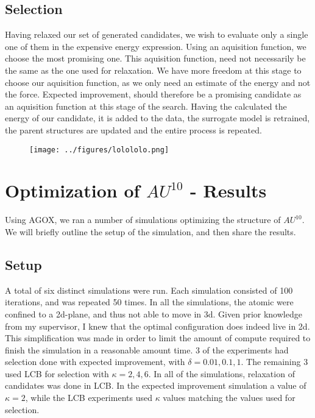 \documentclass[working, oneside]{../../../Preambles/marginclass}
\begin{document}
\subsection{Selection}
Having relaxed our set of generated candidates, we wish to evaluate only a single one of them in the expensive energy expression. Using an aquisition function, we choose the most promising one. This aquisition function, need not necessarily be the same as the one used for relaxation. We have more freedom at this stage to choose our aquisition function, as we only need an estimate of the energy and not the force. Expected improvement, should therefore be a promising candidate as an aquisition function at this stage of the search. Having the calculated the energy of our candidate, it is added to the data, the surrogate model is retrained, the parent structures are updated and the entire process is repeated.
\newpage
{}
\begin{figure}[htpb]
    \centering
    \texttt{[image: ../figures/lolololo.png]}
    \label{fig:}
\end{figure}

\section{Optimization of $AU^{10}$ - Results}


Using AGOX, we ran a number of simulations optimizing the structure of $AU^{10}$. We will briefly outline the setup of the simulation, and then share the results.

\subsection{Setup}
A total of six distinct simulations were run. Each simulation consisted of 100 iterations, and was repeated 50 times. In all the simulations, the atomic were confined to a 2d-plane, and thus not able to move in 3d. Given prior knowledge from my supervisor, I knew that the optimal configuration does indeed live in 2d. This simplification was made in order to limit the amount of compute required to finish the simulation in a reasonable amount time. 3 of the experiments had selection done with expected improvement, with $\delta = 0.01, 0.1, 1$. The remaining 3 used LCB for selection with $\kappa = 2, 4 ,6$. In all of the simulations, relaxation of candidates was done in LCB. In the expected improvement simulation a value of $\kappa = 2$, while the LCB experiments used $\kappa$ values matching the values used for selection.
\end{document}
